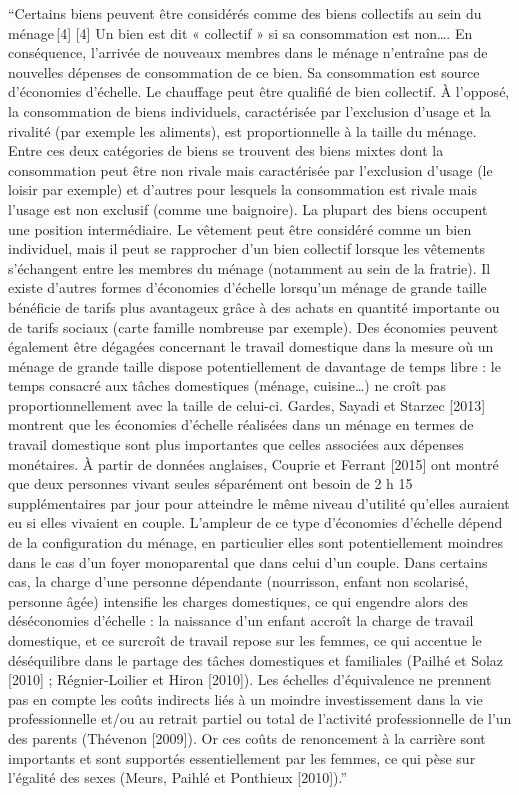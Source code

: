 \documentclass[
  12pt,
]{book}
\begin{document}
``Certains biens peuvent être considérés comme des biens collectifs au
sein du ménage\,{[}4{]} {[}4{]} Un bien est dit « collectif » si sa
consommation est non\ldots. En conséquence, l'arrivée de nouveaux
membres dans le ménage n'entraîne pas de nouvelles dépenses de
consommation de ce bien. Sa consommation est source d'économies
d'échelle. Le chauffage peut être qualifié de bien collectif. À
l'opposé, la consommation de biens individuels, caractérisée par
l'exclusion d'usage et la rivalité (par exemple les aliments), est
proportionnelle à la taille du ménage. Entre ces deux catégories de
biens se trouvent des biens mixtes dont la consommation peut être non
rivale mais caractérisée par l'exclusion d'usage (le loisir par exemple)
et d'autres pour lesquels la consommation est rivale mais l'usage est
non exclusif (comme une baignoire). La plupart des biens occupent une
position intermédiaire. Le vêtement peut être considéré comme un bien
individuel, mais il peut se rapprocher d'un bien collectif lorsque les
vêtements s'échangent entre les membres du ménage (notamment au sein de
la fratrie). Il existe d'autres formes d'économies d'échelle lorsqu'un
ménage de grande taille bénéficie de tarifs plus avantageux grâce à des
achats en quantité importante ou de tarifs sociaux (carte famille
nombreuse par exemple). Des économies peuvent également être dégagées
concernant le travail domestique dans la mesure où un ménage de grande
taille dispose potentiellement de davantage de temps libre : le temps
consacré aux tâches domestiques (ménage, cuisine\ldots) ne croît pas
proportionnellement avec la taille de celui-ci. Gardes, Sayadi et
Starzec {[}2013{]} montrent que les économies d'échelle réalisées dans
un ménage en termes de travail domestique sont plus importantes que
celles associées aux dépenses monétaires. À partir de données anglaises,
Couprie et Ferrant {[}2015{]} ont montré que deux personnes vivant
seules séparément ont besoin de 2 h 15 supplémentaires par jour pour
atteindre le même niveau d'utilité qu'elles auraient eu si elles
vivaient en couple. L'ampleur de ce type d'économies d'échelle dépend de
la configuration du ménage, en particulier elles sont potentiellement
moindres dans le cas d'un foyer monoparental que dans celui d'un couple.
Dans certains cas, la charge d'une personne dépendante (nourrisson,
enfant non scolarisé, personne âgée) intensifie les charges domestiques,
ce qui engendre alors des déséconomies d'échelle : la naissance d'un
enfant accroît la charge de travail domestique, et ce surcroît de
travail repose sur les femmes, ce qui accentue le déséquilibre dans le
partage des tâches domestiques et familiales (Pailhé et Solaz {[}2010{]}
; Régnier-Loilier et Hiron {[}2010{]}). Les échelles d'équivalence ne
prennent pas en compte les coûts indirects liés à un moindre
investissement dans la vie professionnelle et/ou au retrait partiel ou
total de l'activité professionnelle de l'un des parents (Thévenon
{[}2009{]}). Or ces coûts de renoncement à la carrière sont importants
et sont supportés essentiellement par les femmes, ce qui pèse sur
l'égalité des sexes (Meurs, Paihlé et Ponthieux {[}2010{]}).''
\end{document}
